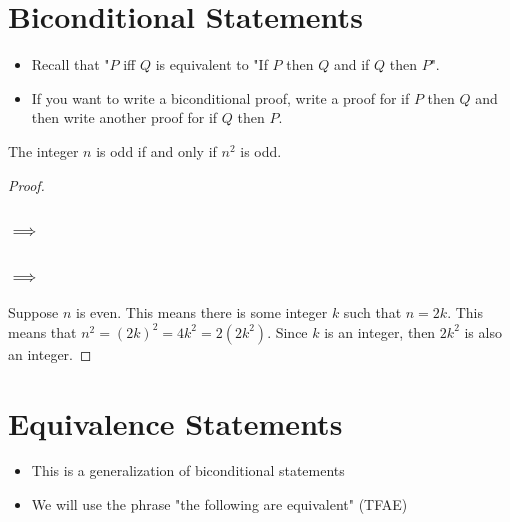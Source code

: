 \section{Biconditional Statements}

\begin{itemize}
    \item Recall that "$P$ iff $Q$ is equivalent to "If $P$ then $Q$ and if $Q$ then $P$".
    \item If you want to write a biconditional proof, write a proof for if $P$ then $Q$ and then write another proof for if $Q$ then $P$. 
\end{itemize}

\begin{proposition}
    The integer $n$ is odd if and only if $n^2$ is odd. 
\end{proposition}

\begin{proof}
    \subsubsection*{$\implies$}


    \subsubsection{$\implies$}

    Suppose $n$ is even. This means there is some integer $k$ such that $n = 2k$. This means that $n^2 = (2k)^2 = 4k^2 = 2(2k^2)$. Since $k$ is an integer, then $2k^2$ is also an integer. 
\end{proof}


\section{Equivalence Statements}

\begin{itemize}
    \item This is a generalization of biconditional statements
    \item We will use the phrase "the following are equivalent" (TFAE)
\end{itemize}

